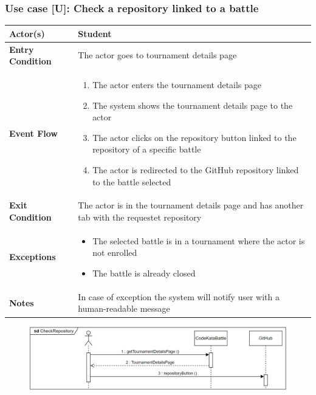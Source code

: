 \documentclass[12pt, a4paper]{report}
\newcounter{useCase}
\newcommand{\usecase}[9]{
    \def\arraystretch{1.5} 
    \subsubsection*{Use case [U#2]: #3}
    \vspace*{0.2cm}
    \begin{center}
        \begin{tabular}{|l|p{12cm}|}
            \hline
            \textbf{Actor(s)} & #4 \\
            \hline
            \textbf{Entry Condition} & #5 \\
            \hline
            \textbf{Event Flow} & #6 \\
            \hline
            \textbf{Exit Condition} & #7 \\
            \hline
            \textbf{Exceptions} & #8 \\
            \hline
            \textbf{Notes} & #9 \\
            \hline
        \end{tabular}
    \end{center}
    #1
}
\begin{document}
        \usecase{\begin{figure}[H]\centering\includegraphics[width=0.9\linewidth]{images/checkrepo.png}\end{figure}}        
        {\arabic{useCase}\stepcounter{useCase}}
        {Check a repository linked to a battle}
        {Student}
        {The actor goes to tournament details page}
        {
        \begin{enumerate}
            \item The actor enters the tournament details page
            \item The system shows the tournament details page to the actor
            \item The actor clicks on the repository button linked to the repository of a specific battle
            \item The actor is redirected to the GitHub repository linked to the battle selected
        \end{enumerate}
        }
        {The actor is in the tournament details page and has another tab with the requestet repository}
        {
        \begin{itemize}
            \item The selected battle is in a tournament where the actor is not enrolled
            \item The battle is already closed
        \end{itemize}
        }
        {In case of exception the system will notify user with a human-readable message}
\end{document}
